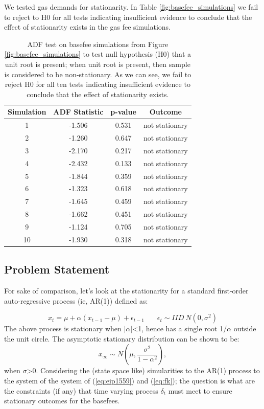 \documentclass{article}
\begin{document}
We tested gas demands for stationarity. In Table \ref{fig:basefee_simulations} we fail to reject to H0 for all tests indicating insufficient evidence to conclude that the effect of stationarity exists in the gas fee simulations. 
 
\begin{table}
\centering
\begin{tabular}{ |c|c|c|c| } 
\hline
 Simulation & ADF Statistic & p-value & Outcome \\
\hline
1 & -1.506 & 0.531 & not stationary \\
2 & -1.260 & 0.647 & not stationary \\
3 & -2.170 & 0.217 & not stationary \\
4 & -2.432 & 0.133 & not stationary \\
5 & -1.844 & 0.359 & not stationary \\
6 & -1.323 & 0.618 & not stationary \\
7 & -1.645 & 0.459 & not stationary \\
8 & -1.662 & 0.451 & not stationary \\
9 & -1.124 & 0.705 & not stationary \\
10 & -1.930 & 0.318 & not stationary \\
\hline
\end{tabular}
\caption{ADF test on basefee simulations from Figure \ref{fig:basefee_simulations} to test null hypothesis (H0) that a unit root is present; when unit root is present, then sample is considered to be non-stationary. As we can see, we fail to reject H0 for all ten tests indicating insufficient evidence to conclude that the effect of stationarity exists.}
\label{table:pow_vs_pos}
\end{table}

\subsection{Problem Statement}
\label{section:problem_statement}
For sake of comparison, let's look at the stationarity for a standard first-order auto-regressive process  (ie, AR(1)) defined as:

\begin{equation}
x_{t} = \mu + \alpha (x_{t-1} -\mu) + \epsilon_{t-1} ~~~~~~~~ \epsilon_{t} \sim IID~N(0,\sigma^2)
\label{eq:ar1} 
\end{equation}
The above process is stationary when $|\alpha|$<1, hence has a single root 1/$\alpha$ outside the unit circle. The asymptotic stationary distribution can be shown to be:
\begin{equation}
x_{\infty} \sim N(\mu,\frac{\sigma^2}{1-\alpha^2}),
\label{eq:x_infinity} 
\end{equation}
when $\sigma$>0. Considering the (state space like) simularities to the AR(1) process to the system of the system of (\ref{eq:eip1559}) and (\ref{eq:fk}); the question is what are the constraints (if any) that time varying process $\delta_{t}$ must meet to ensure stationary outcomes for the basefees.
\end{document}
